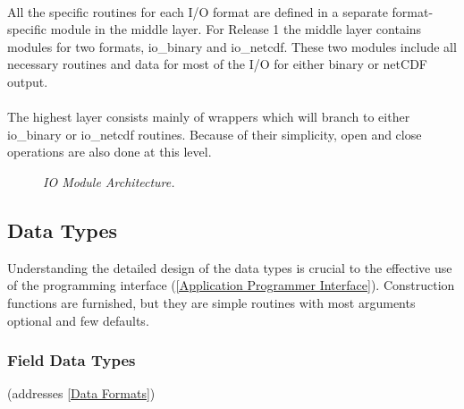 \documentclass[11pt]{article}
\begin{document}
\paragraph{}
All the specific routines for each I/O format are defined
in a separate format-specific module in the middle layer.
For Release 1 the middle layer contains modules for two formats,
io\_binary and io\_netcdf.
These two modules include all necessary routines and
data for most of the I/O for either binary or netCDF output.
\paragraph{}
The highest layer consists mainly of wrappers which will
branch to either io\_binary or io\_netcdf routines.  Because
of their simplicity, open and close operations are also
done at this level.
~\\
\begin{figure}
\begin{centering}
\hspace{0.1cm}
\caption{{\em IO Module Architecture.} \label{fig_modarch}}
\end{centering}
\end{figure}

\subsection{Data Types}
\label{Data Types}

Understanding the detailed design of the data types is crucial
to the effective use of the programming interface
(\ref{Application Programmer Interface}).  Construction functions
are furnished, but they are simple routines with
most arguments optional and few defaults.

\subsubsection{Field Data Types}
(addresses \ref{Data Formats})

\end{document}
